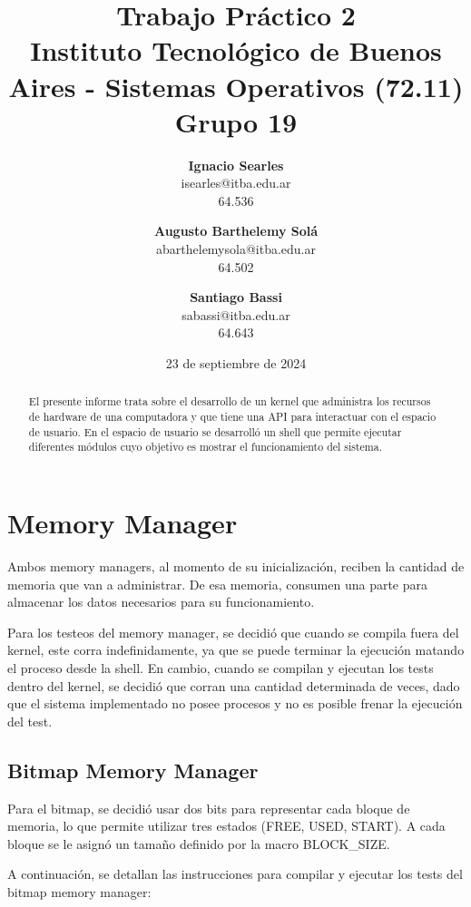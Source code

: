 \documentclass{article}
\title{\textbf{Trabajo Práctico 2} \\ [1ex]
\large Instituto Tecnológico de Buenos Aires - Sistemas Operativos (72.11) \\ [1ex]
\large Grupo 19 }
\date{23 de septiembre de 2024}
\author{
\textbf{Ignacio Searles}\\
isearles@itba.edu.ar\\
64.536
\and
\textbf{Augusto Barthelemy Solá}\\
abarthelemysola@itba.edu.ar\\
64.502
\and
\textbf{Santiago Bassi}\\
sabassi@itba.edu.ar\\
64.643
}
\begin{document}
\maketitle

\begin {abstract}

El presente informe trata sobre el desarrollo de un kernel que administra los recursos de hardware de una computadora y que tiene una API para interactuar con el espacio de usuario. En el espacio de usuario se desarrolló un shell que permite ejecutar diferentes módulos cuyo objetivo es mostrar el funcionamiento del sistema.

\end {abstract}

\section {Memory Manager}

Ambos memory managers, al momento de su inicialización, reciben la cantidad de memoria que van a administrar. De esa memoria, consumen una parte para almacenar los datos necesarios para su funcionamiento.

Para los testeos del memory manager, se decidió que cuando se compila fuera del kernel, este corra indefinidamente, ya que se puede terminar la ejecución matando el proceso desde la shell. En cambio, cuando se compilan y ejecutan los tests dentro del kernel, se decidió que corran una cantidad determinada de veces, dado que el sistema implementado no posee procesos y no es posible frenar la ejecución del test.

\subsection {Bitmap Memory Manager}

Para el bitmap, se decidió usar dos bits para representar cada bloque de memoria, lo que permite utilizar tres estados (FREE, USED, START). A cada bloque se le asignó un tamaño definido por la macro BLOCK\_SIZE.

A continuación, se detallan las instrucciones para compilar y ejecutar los tests del bitmap memory manager:
\end{document}
